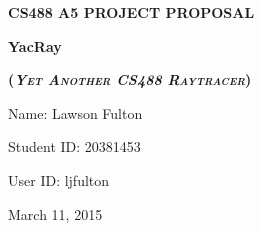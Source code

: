 \documentclass {article}
\begin{document}
%
%









%

\begin{center}
\Large

\textbf{\MakeUppercase{CS488 A5 Project Proposal}}
\vfill  

{
\Huge
\textbf{YacRay}
}

 {
        \Large
	\textsc{\textbf{(\textit{Yet Another CS488 Raytracer})}}
 }

\vfill
Name: Lawson Fulton

Student ID: 20381453

User ID: ljfulton

March 11, 2015
\end{center}
\end{document}
